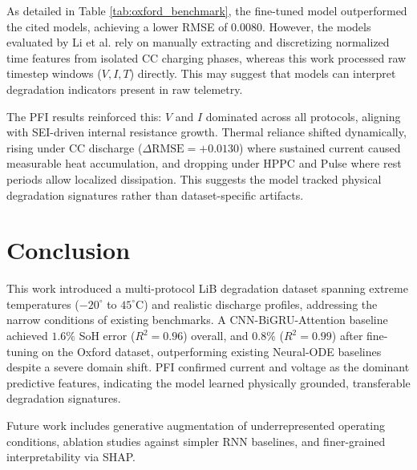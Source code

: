 \documentclass[conference]{IEEEtran}
\begin{document}
As detailed in Table \ref{tab:oxford_benchmark}, the fine-tuned model outperformed the cited models, achieving a lower RMSE of $0.0080$. However, the models evaluated by Li et al. rely on manually extracting and discretizing normalized time features from isolated CC charging phases, whereas this work processed raw timestep windows ($V, I, T$) directly. This may suggest that models can interpret degradation indicators present in raw telemetry.

The PFI results reinforced this: $V$ and $I$ dominated across all protocols, aligning with SEI-driven internal resistance growth. Thermal reliance shifted dynamically, rising under CC discharge ($\Delta\text{RMSE} = +0.0130$) where sustained current caused measurable heat accumulation, and dropping under HPPC and Pulse where rest periods allow localized dissipation. This suggests the model tracked physical degradation signatures rather than dataset-specific artifacts.

\section{Conclusion}

This work introduced a multi-protocol LiB degradation dataset spanning extreme temperatures ($-20^\circ$ to $45^\circ\text{C}$) and realistic discharge profiles, addressing the narrow conditions of existing benchmarks. A CNN-BiGRU-Attention baseline achieved $1.6\%$ SoH error ($R^2=0.96$) overall, and $0.8\%$ ($R^2=0.99$) after fine-tuning on the Oxford dataset, outperforming existing Neural-ODE baselines despite a severe domain shift. PFI confirmed current and voltage as the dominant predictive features, indicating the model learned physically grounded, transferable degradation signatures.

Future work includes generative augmentation of underrepresented operating conditions, ablation studies against simpler RNN baselines, and finer-grained interpretability via SHAP.



\end{document}
